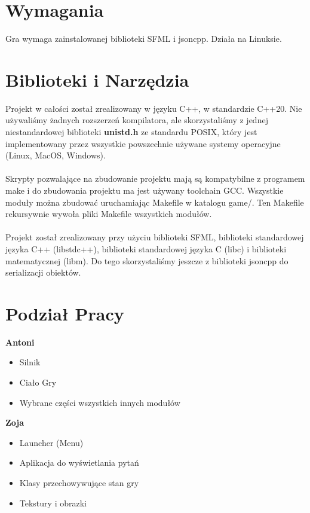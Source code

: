 \documentclass[12pt, titlepage]{article}
\begin{document}
\section{Wymagania}
Gra wymaga zainstalowanej biblioteki
SFML i jsoncpp. Działa na Linuksie. 

\section{Biblioteki i Narzędzia}
Projekt w całości został zrealizowany
w języku C++, w standardzie C++20.
Nie używaliśmy żadnych rozszerzeń
kompilatora, ale skorzystaliśmy
z jednej niestandardowej biblioteki
\textbf{unistd.h} ze standardu POSIX,
który jest implementowany przez
wszystkie powszechnie używane systemy
operacyjne (Linux, MacOS, Windows).
\\~\\
Skrypty pozwalające na zbudowanie
projektu mają są kompatybilne z
programem make i do zbudowania
projektu ma jest używany toolchain
GCC. Wszystkie moduły można zbudować
uruchamiając Makefile w katalogu game/.
Ten Makefile rekursywnie wywoła
pliki Makefile wszystkich modułów.
\\~\\
Projekt został zrealizowany przy
użyciu biblioteki SFML, biblioteki
standardowej języka C++ (libstdc++),
biblioteki standardowej języka C (libc)
i biblioteki matematycznej (libm).
Do tego skorzystaliśmy jeszcze z
biblioteki jsoncpp do serializacji
obiektów.

\section{Podział Pracy}
\textbf{Antoni}
\begin{itemize}
	\item Silnik
	\item Ciało Gry
	\item Wybrane części
	      wszystkich innych
	      modułów
\end{itemize}
 
\noindent
\textbf{Zoja}
\begin{itemize}
	\item Launcher (Menu)
	\item Aplikacja do wyświetlania pytań
	\item Klasy przechowywujące stan gry
	\item Tekstury i obrazki
\end{itemize}
\end{document}
